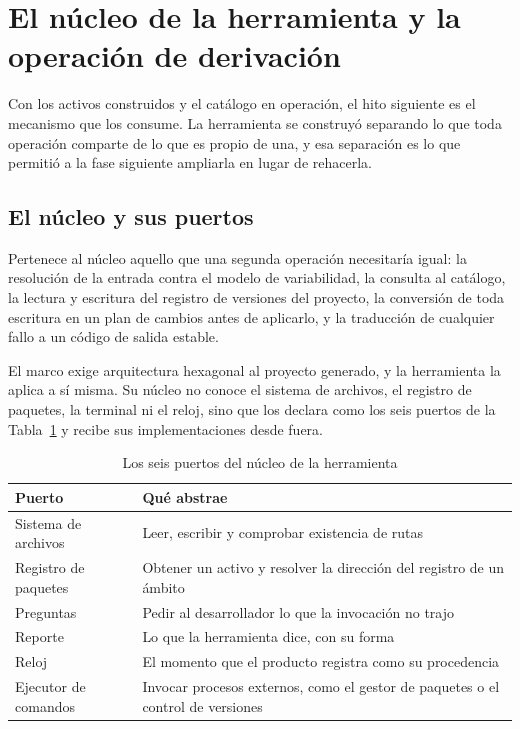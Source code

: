 \section{El núcleo de la herramienta y la operación de derivación}
\label{sec:herramienta-cli}

Con los activos construidos y el catálogo en operación, el hito siguiente es
el mecanismo que los consume. La herramienta se construyó separando lo que
toda operación comparte de lo que es propio de una, y esa separación es lo
que permitió a la fase siguiente ampliarla en lugar de rehacerla.

\subsection{El núcleo y sus puertos}
\label{sec:nucleo-herramienta}

Pertenece al núcleo aquello que una segunda operación necesitaría igual: la
resolución de la entrada contra el modelo de variabilidad, la consulta al
catálogo, la lectura y escritura del registro de versiones del proyecto, la
conversión de toda escritura en un plan de cambios antes de aplicarlo, y la
traducción de cualquier fallo a un código de salida estable.

El marco exige arquitectura hexagonal al proyecto generado, y la herramienta
la aplica a sí misma. Su núcleo no conoce el sistema de archivos, el registro
de paquetes, la terminal ni el reloj, sino que los declara como los seis
puertos de la Tabla~\ref{tab:puertos-nucleo} y recibe sus implementaciones
desde fuera.

\begin{table}[H]
\centering
\begin{tabular}{p{4.8cm}p{10.2cm}}
\toprule
\textbf{Puerto} & \textbf{Qué abstrae} \\
\midrule
Sistema de archivos & Leer, escribir y comprobar existencia de rutas \\
Registro de paquetes & Obtener un activo y resolver la dirección del registro de un ámbito \\
Preguntas & Pedir al desarrollador lo que la invocación no trajo \\
Reporte & Lo que la herramienta dice, con su forma \\
Reloj & El momento que el producto registra como su procedencia \\
Ejecutor de comandos & Invocar procesos externos, como el gestor de paquetes o el control de versiones \\
\bottomrule
\end{tabular}
\caption{Los seis puertos del núcleo de la herramienta}
\label{tab:puertos-nucleo}
\end{table}

